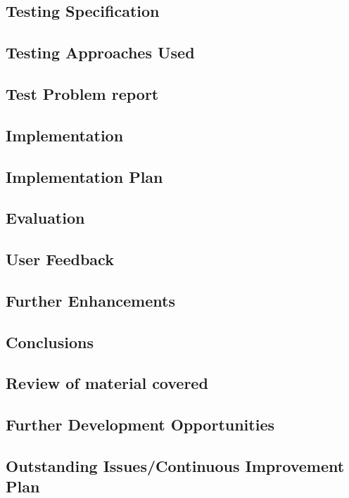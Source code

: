 \documentclass[a4paper,12pt]{article}
\begin{document}
\begin{samepage}
\section {Testing Specification}
\subsection {Testing Approaches Used}
\subsection {Test Problem report}
\end{samepage}
\begin{samepage}
\section {Implementation}
\subsection {Implementation Plan}
\end{samepage}
\begin{samepage}
\section {Evaluation}
\subsection {User Feedback}
\subsection {Further Enhancements}
\end{samepage}
\begin{samepage}
\section {Conclusions}
\subsection {Review of material covered }
\subsection {Further Development Opportunities}
\subsection {Outstanding Issues/Continuous Improvement Plan}
\end{samepage}
\end{document}
